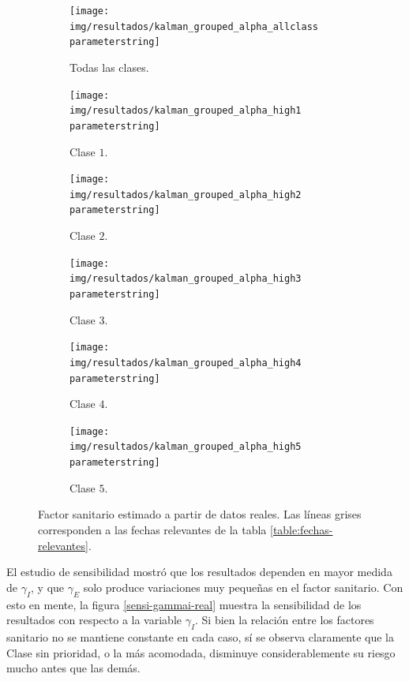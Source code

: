 \begin{figure}[H]
     \centering
     \begin{subfigure}[b]{.99\textwidth}
         \centering
         \texttt{[image: img/resultados/kalman\_grouped\_alpha\_allclass\\parameterstring]}
         \caption{Todas las clases.}
     \end{subfigure}
     \hfill
     \begin{subfigure}[b]{0.47\textwidth}
         \centering
         \texttt{[image: img/resultados/kalman\_grouped\_alpha\_high1\\parameterstring]}
         \caption{Clase \(1\).}
     \end{subfigure}
     \hfill
     \begin{subfigure}[b]{.47\textwidth}
         \centering
         \texttt{[image: img/resultados/kalman\_grouped\_alpha\_high2\\parameterstring]}
         \caption{Clase \(2\).}
     \end{subfigure}
     \hfill
     \begin{subfigure}[b]{.47\textwidth}
         \centering
         \texttt{[image: img/resultados/kalman\_grouped\_alpha\_high3\\parameterstring]}
         \caption{Clase \(3\).}
     \end{subfigure}
     \hfill
     \begin{subfigure}[b]{.47\textwidth}
         \centering
         \texttt{[image: img/resultados/kalman\_grouped\_alpha\_high4\\parameterstring]}
         \caption{Clase \(4\).}
     \end{subfigure}
     \hfill
     \begin{subfigure}[b]{.47\textwidth}
         \centering
         \texttt{[image: img/resultados/kalman\_grouped\_alpha\_high5\\parameterstring]}
         \caption{Clase \(5\).}
     \end{subfigure}
        \caption[Factor sanitario estimado a partir de datos reales.]{Factor sanitario estimado a partir de datos reales. Las líneas grises corresponden a las fechas relevantes de la tabla \ref{table:fechas-relevantes}.}
        \label{alpha-comp-high}
\end{figure}


El estudio de sensibilidad mostró que los resultados dependen en mayor medida de \(\gamma_I\), y que \(\gamma_E\) solo produce variaciones muy pequeñas en el factor sanitario. Con esto en mente, la figura \ref{sensi-gammai-real} muestra la sensibilidad de los resultados con respecto a la variable \(\gamma_I\). Si bien la relación entre los factores sanitario no se mantiene constante en cada caso, sí se observa claramente que la Clase sin prioridad, o la más acomodada, disminuye considerablemente su riesgo mucho antes que las demás.

